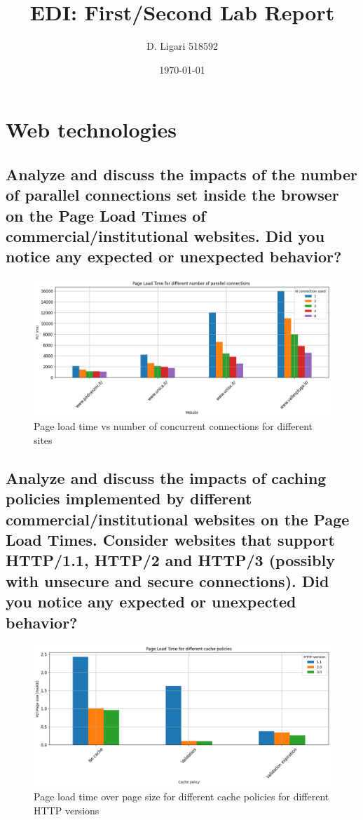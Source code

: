 \documentclass[eng]{class}
\title{EDI: First/Second Lab Report}
\author[1]{D. Ligari 518592}
\affil[1]{University of Pavia, Department of Computer Engineering (Data Science), Pavia, Italy}
\date{\today}
\begin{document}
\maketitle
\tableofcontents
\thispagestyle{FirstPage}
\section{Web technologies}
\subsection*{Analyze and discuss the impacts of the number of parallel connections set inside the browser
  on the Page Load Times of commercial/institutional websites. Did you notice any expected or
  unexpected behavior?}

\begin{figure}[H]
  \centering
  \includegraphics[width=.9\columnwidth]{images/plt_vs_conc_1.1.png}
  \caption{Page load time vs number of concurrent connections for different sites}
  \label{fig-1}
\end{figure}

\pagestyle{OtherPage}

\subsection*{Analyze and discuss the impacts of caching policies implemented by different
  commercial/institutional websites on the Page Load Times. Consider websites that support
  HTTP/1.1, HTTP/2 and HTTP/3 (possibly with unsecure and secure connections). Did you notice
  any expected or unexpected behavior?}


\begin{figure}[H]
  \centering
  \includegraphics[width=.9\columnwidth]{images/plt_cache_policy.png}
  \caption{Page load time over page size for different cache policies for different HTTP versions}
  \label{fig-2}
\end{figure}
\end{document}
